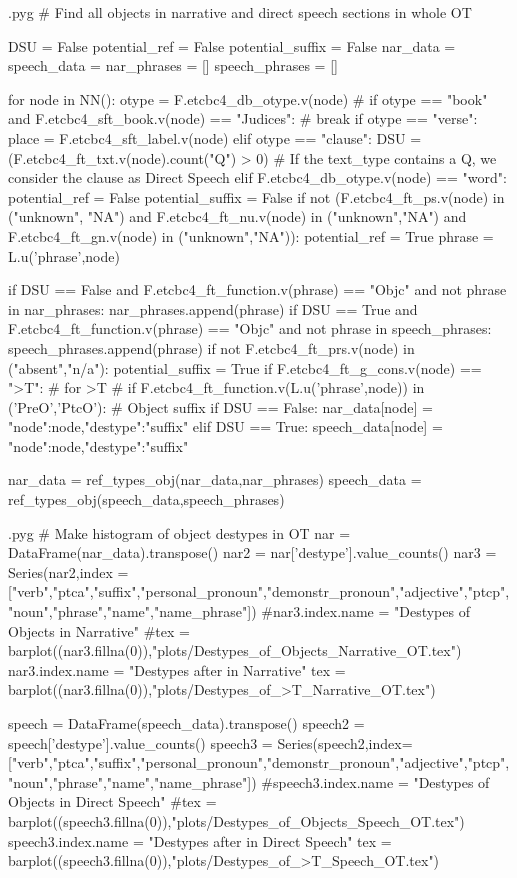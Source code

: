 \documentclass{report}
\makeatletter
\newenvironment{python}{%
  \VerbatimEnvironment
  \minted@resetoptions
  \setkeys{minted@opt}{}
      \begin{VerbatimOut}{\jobname.pyg}}
{%
      \end{VerbatimOut}
      \minted@pygmentize{python}
      \DeleteFile{\jobname.pyg}}
\makeatother
\begin{document}
\begin{python}
# Find all objects in narrative and direct speech sections in whole OT 

DSU = False
potential_ref = False
potential_suffix = False
nar_data = {}
speech_data = {}
nar_phrases = []
speech_phrases = []

for node in NN():
    otype = F.etcbc4_db_otype.v(node)
#    if otype == "book" and F.etcbc4_sft_book.v(node) == "Judices":
#        break
    if otype == "verse":
        place = F.etcbc4_sft_label.v(node)
    elif otype == "clause":
        DSU = (F.etcbc4_ft_txt.v(node).count("Q") > 0)    # If the text_type contains a Q, we consider the clause as Direct Speech
    elif F.etcbc4_db_otype.v(node) == "word":
        potential_ref = False
        potential_suffix = False
        if not (F.etcbc4_ft_ps.v(node) in ("unknown", "NA") and F.etcbc4_ft_nu.v(node) in ("unknown","NA") and F.etcbc4_ft_gn.v(node) in ("unknown","NA")):
            potential_ref = True
            phrase = L.u('phrase',node)
            
            if DSU == False and F.etcbc4_ft_function.v(phrase) == "Objc" and not phrase in nar_phrases:
                nar_phrases.append(phrase)
            if DSU == True and F.etcbc4_ft_function.v(phrase) == "Objc" and not phrase in speech_phrases:
                speech_phrases.append(phrase) 
        if not F.etcbc4_ft_prs.v(node) in ("absent","n/a"):
            potential_suffix = True
            if F.etcbc4_ft_g_cons.v(node) == ">T": # for >T
#            if F.etcbc4_ft_function.v(L.u('phrase',node)) in ('PreO','PtcO'): # Object suffix
                if DSU == False:
                    nar_data[node] = {"node":node,"destype":"suffix"}
                elif DSU == True:
                    speech_data[node] = {"node":node,"destype":"suffix"}

nar_data = ref_types_obj(nar_data,nar_phrases)
speech_data = ref_types_obj(speech_data,speech_phrases)

\end{python}

\begin{python}
# Make histogram of object destypes in OT
nar = DataFrame(nar_data).transpose()
nar2 = nar['destype'].value_counts()
nar3 = Series(nar2,index = ["verb","ptca","suffix","personal_pronoun","demonstr_pronoun","adjective","ptcp","noun","phrase","name","name_phrase"])
#nar3.index.name = "Destypes of Objects in Narrative"
#tex = barplot((nar3.fillna(0)),"plots/Destypes_of_Objects_Narrative_OT.tex")
nar3.index.name = "Destypes after  in Narrative"
tex = barplot((nar3.fillna(0)),"plots/Destypes_of_>T_Narrative_OT.tex")


speech = DataFrame(speech_data).transpose()
speech2 = speech['destype'].value_counts()
speech3 = Series(speech2,index=["verb","ptca","suffix","personal_pronoun","demonstr_pronoun","adjective","ptcp","noun","phrase","name","name_phrase"])
#speech3.index.name = "Destypes of Objects in Direct Speech"
#tex = barplot((speech3.fillna(0)),"plots/Destypes_of_Objects_Speech_OT.tex")
speech3.index.name = "Destypes after  in Direct Speech"
tex = barplot((speech3.fillna(0)),"plots/Destypes_of_>T_Speech_OT.tex")
\end{python}
\end{document}
